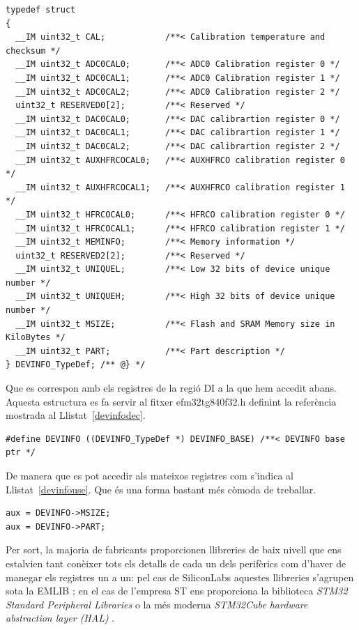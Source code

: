 \begin{lstlisting}[label=devinfo,caption={Exemple de definició d'estructura per accedir a memòria},style=customc]
typedef struct
{
  __IM uint32_t CAL;            /**< Calibration temperature and checksum */
  __IM uint32_t ADC0CAL0;       /**< ADC0 Calibration register 0 */
  __IM uint32_t ADC0CAL1;       /**< ADC0 Calibration register 1 */
  __IM uint32_t ADC0CAL2;       /**< ADC0 Calibration register 2 */
  uint32_t RESERVED0[2];        /**< Reserved */
  __IM uint32_t DAC0CAL0;       /**< DAC calibrartion register 0 */
  __IM uint32_t DAC0CAL1;       /**< DAC calibrartion register 1 */
  __IM uint32_t DAC0CAL2;       /**< DAC calibrartion register 2 */
  __IM uint32_t AUXHFRCOCAL0;   /**< AUXHFRCO calibration register 0 */
  __IM uint32_t AUXHFRCOCAL1;   /**< AUXHFRCO calibration register 1 */
  __IM uint32_t HFRCOCAL0;      /**< HFRCO calibration register 0 */
  __IM uint32_t HFRCOCAL1;      /**< HFRCO calibration register 1 */
  __IM uint32_t MEMINFO;        /**< Memory information */
  uint32_t RESERVED2[2];        /**< Reserved */
  __IM uint32_t UNIQUEL;        /**< Low 32 bits of device unique number */
  __IM uint32_t UNIQUEH;        /**< High 32 bits of device unique number */
  __IM uint32_t MSIZE;          /**< Flash and SRAM Memory size in KiloBytes */
  __IM uint32_t PART;           /**< Part description */
} DEVINFO_TypeDef; /** @} */
\end{lstlisting}

Que es correspon amb els registres de la regió DI a la que hem accedit abans. Aquesta estructura es fa servir al fitxer efm32tg840f32.h definint la referència mostrada al Llistat~\ref {devinfodec}.

\begin{lstlisting}[label=devinfodec,caption={Declaració d'una variable d'accés a la memòria estructurada},style=customc]
#define DEVINFO ((DEVINFO_TypeDef *) DEVINFO_BASE) /**< DEVINFO base ptr */
\end{lstlisting}

De manera que es pot accedir als mateixos registres com s'indica al
Llistat~\ref {devinfouse}. Que és una forma bastant més còmoda de treballar.

\begin{lstlisting}[label=devinfouse,caption={Ús de l'estructura d'accés},style=customc]
aux = DEVINFO->MSIZE;
aux = DEVINFO->PART;
\end{lstlisting}

Per sort, la majoria de fabricants proporcionen llibreries de baix nivell que ens estalvien tant conèixer tots els detalls de cada un dels perifèrics com d'haver de manegar els registres un a un: pel cas de SiliconLabs aquestes llibreries s'agrupen sota la EMLIB \cite{EMLIB}; en el cas de l'empresa ST ens proporciona la biblioteca {\em STM32 Standard Peripheral Libraries} \cite{STM32Lib} o la més moderna {\em  STM32Cube hardware abstraction layer (HAL)} \cite{STM32CubeHAL}.


